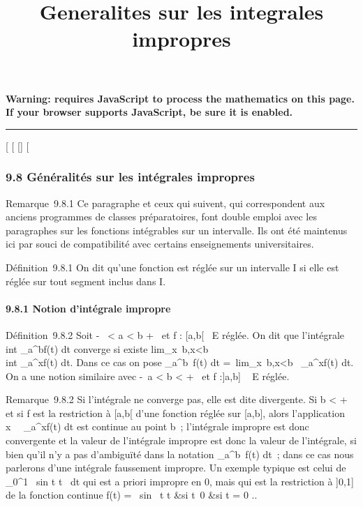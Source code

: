 \documentclass[]{article}
\title{Generalites sur les integrales impropres}
\author{}
\date{}
\begin{document}
\maketitle

\textbf{Warning: 
requires JavaScript to process the mathematics on this page.\\ If your
browser supports JavaScript, be sure it is enabled.}

\begin{center}\rule{3in}{0.4pt}\end{center}

[
[
[]
[

\subsubsection{9.8 Généralités sur les intégrales impropres}

Remarque~9.8.1 Ce paragraphe et ceux qui suivent, qui correspondent aux
anciens programmes de classes préparatoires, font double emploi avec les
paragraphes sur les fonctions intégrables sur un intervalle. Ils ont été
maintenus ici par souci de compatibilité avec certains enseignements
universitaires.

Définition~9.8.1 On dit qu'une fonction est réglée sur un intervalle I
si elle est réglée sur tout segment inclus dans I.

\paragraph{9.8.1 Notion d'intégrale impropre}

Définition~9.8.2 Soit -\infty~ < a < b \leq +\infty~ et f :
[a,b[\rightarrow~ E réglée. On dit que l'intégrale \\int
 _a^bf(t) dt converge si existe
lim_x\rightarrow~b,x<b~\\int
 _a^xf(t) dt. Dans ce cas on pose
\int  _a^b~f(t) dt
=\
lim_x\rightarrow~b,x<b\int ~
_a^xf(t) dt. On a une notion similaire avec -\infty~\leq a
< b < +\infty~ et f :]a,b] \rightarrow~ E réglée.

Remarque~9.8.2 Si l'intégrale ne converge pas, elle est dite divergente.
Si b < +\infty~ et si f est la restriction à [a,b[ d'une
fonction réglée sur [a,b], alors l'application
x\mapsto~\int ~
_a^xf(t) dt est continue au point b~; l'intégrale impropre
est donc convergente et la valeur de l'intégrale impropre est donc la
valeur de l'intégrale, si bien qu'il n'y a pas d'ambiguïté dans la
notation \int  _a^b~f(t) dt~; dans
ce cas nous parlerons d'une intégrale faussement impropre. Un exemple
typique est celui de \int  _0^1~
sin t \over t~ dt qui est a
priori impropre en 0, mais qui est la restriction à ]0,1] de la
fonction continue f(t) = \left \
\cases  sin~ t
\over t &si t\neq~0
 &si t = 0 \cr 
\right ..
\end{document}
